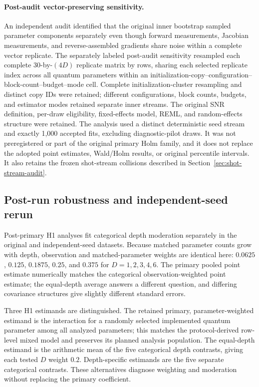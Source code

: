 \documentclass[pdflatex,sn-mathphys-num,Numbered]{sn-jnl}
\begin{document}
\paragraph{Post-audit vector-preserving sensitivity.}\label{sec:vector-bootstrap-method}
An independent audit identified that the original inner bootstrap sampled parameter components separately even though forward measurements, Jacobian measurements, and reverse-assembled gradients share noise within a complete vector replicate. The separately labeled post-audit sensitivity resampled each complete 30-by-$(4D)$ replicate matrix by rows, sharing each selected replicate index across all quantum parameters within an initialization-copy--configuration--block-count--budget--mode cell. Complete initialization-cluster resampling and distinct copy IDs were retained; different configurations, block counts, budgets, and estimator modes retained separate inner streams. The original SNR definition, per-draw eligibility, fixed-effects model, REML, and random-effects structure were retained. The analysis used a distinct deterministic seed stream and exactly 1,000 accepted fits, excluding diagnostic-pilot draws. It was not preregistered or part of the original primary Holm family, and it does not replace the adopted point estimates, Wald/Holm results, or original percentile intervals. It also retains the frozen shot-stream collisions described in Section~\ref{sec:shot-stream-audit}.


\subsection{Post-run robustness and independent-seed rerun}\label{sec:h2-depth-methods}

Post-primary H1 analyses fit categorical depth moderation separately in the original and independent-seed datasets. Because matched parameter counts grow with depth, observation and matched-parameter weights are identical here: $0.0625$, $0.125$, $0.1875$, $0.25$, and $0.375$ for $D=1,2,3,4,6$. The primary pooled point estimate numerically matches the categorical observation-weighted point estimate; the equal-depth average answers a different question, and differing covariance structures give slightly different standard errors.

Three H1 estimands are distinguished. The retained primary, parameter-weighted estimand is the interaction for a randomly selected implemented quantum parameter among all analyzed parameters; this matches the protocol-derived row-level mixed model and preserves its planned analysis population. The equal-depth estimand is the arithmetic mean of the five categorical depth contrasts, giving each tested $D$ weight $0.2$. Depth-specific estimands are the five separate categorical contrasts. These alternatives diagnose weighting and moderation without replacing the primary coefficient.
\end{document}
